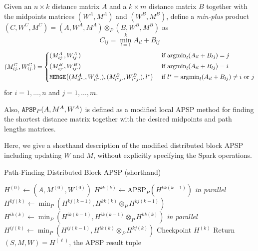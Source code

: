 \documentclass{article} %
\newcommand{\argmin}{\mathrm{argmin}}
\begin{document}
Given an $n \times k$ distance matrix $A$ and a $k \times m$ distance matrix $B$ together with the midpoints matrices $(W^A, M^A)$ and $(W^B, M^B)$, define a \emph{min-plus} product $(C, W^C, M^C) = (A, W^A, M^A) \otimes_P (B, W^B, M^B)$ as
\[
C_{ij} = \min_{l = 1}^k A_{il} + B_{lj}
\]
\[
(M^C_{ij\cdot}, W^C_{ij\cdot}) = 
\begin{cases}
\vspace{1mm}
(M^A_{ij\cdot}, W^A_{ij\cdot}) & \text{ if }\argmin_l(A_{il} + B_{lj}) = j \\
\vspace{1mm}
(M^B_{ij\cdot}, W^B_{ij\cdot}) & \text{ if }\argmin_l(A_{il} + B_{lj}) = i \\
\vspace{1mm}
{\tt MERGE}\big((M^A_{il^*\cdot}, W^A_{il^*\cdot}), (M^B_{l^*j\cdot}, W^B_{l^*j\cdot}), l^*\big)
& \text{ if } l^* = \argmin_l(A_{il} + B_{lj}) \neq i \text{ or } j
\end{cases}
\]
for $i = 1,\hdots, n$ and $j = 1,\hdots, m$.

Also, ${\tt APSP}_P(A, M^A, W^A)$ is defined as a modified local APSP method for finding the shortest distance matrix together with the desired midpoints and path lengths matrices. 

Here, we give a shorthand description of the modified distributed block APSP including updating $W$ and $M$, without explicitly specifying the Spark operations.

\begin{algorithm}[H]
\caption{Path-Finding Distributed Block APSP (shorthand)}
\begin{algorithmic}
  \State $H^{(0)} \leftarrow (A, M^{(0)}, W^{(0)})$
    \State [A-step]
    \State $H^{kk(k)} \leftarrow \text{APSP}_P(H^{kk(k-1)})$
    \State [B-step]
     \emph{in parallel}
        \State $H^{kj(k)} \leftarrow \min_P(H^{kj(k-1)}, H^{kk(k)} \otimes_P H^{kj(k-1)})$ 
      \EndIf
        \State $H^{ik(k)} \leftarrow \min_P(H^{ik(k-1)}, H^{ik(k-1)} \otimes_P H^{kk(k)})$
      \EndIf
    \EndFor
    \State [C-step]
     \emph{in parallel}
        \State $H^{ij(k)} \leftarrow \min_P(H^{ij(k-1)}, H^{ik(k)} \otimes_P H^{kj(k)})$
      \EndIf
    \EndFor
    \State [D-step]
      \State Checkpoint $H^{(k)}$
    \EndIf
  \EndFor
  \State Return $(S, M, W) = H^{(\ell)}$, the APSP result tuple 
  \EndFunction
\end{algorithmic}
\end{algorithm}
\end{document}
